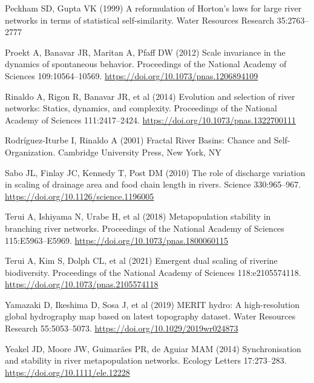 \documentclass[
  12pt,
]{article}
\newlength{\cslhangindent}
\newlength{\cslentryspacingunit} %
\newenvironment{CSLReferences}[2] %
 {%
  \setlength{\parindent}{0pt}
  \ifodd #1
  \let\oldpar\par
  \def\par{\hangindent=\cslhangindent\oldpar}
  \fi
  \setlength{\parskip}{#2\cslentryspacingunit}
 }%
 {}
\begin{document}
\begin{CSLReferences}{1}{0}
\leavevmode{}%
Peckham SD, Gupta VK (1999) A reformulation of {Horton}'s laws for large river networks in terms of statistical self-similarity. Water Resources Research 35:2763--2777

\leavevmode{}%
Proekt A, Banavar JR, Maritan A, Pfaff DW (2012) Scale invariance in the dynamics of spontaneous behavior. Proceedings of the National Academy of Sciences 109:10564--10569. \url{https://doi.org/10.1073/pnas.1206894109}

\leavevmode{}%
Rinaldo A, Rigon R, Banavar JR, et al (2014) Evolution and selection of river networks: {Statics}, dynamics, and complexity. Proceedings of the National Academy of Sciences 111:2417--2424. \url{https://doi.org/10.1073/pnas.1322700111}

\leavevmode{}%
Rodríguez-Iturbe I, Rinaldo A (2001) Fractal {River Basins}: {Chance} and {Self-Organization}. {Cambridge University Press}, {New York, NY}

\leavevmode{}%
Sabo JL, Finlay JC, Kennedy T, Post DM (2010) The role of discharge variation in scaling of drainage area and food chain length in rivers. Science 330:965--967. \url{https://doi.org/10.1126/science.1196005}

\leavevmode{}%
Terui A, Ishiyama N, Urabe H, et al (2018) Metapopulation stability in branching river networks. Proceedings of the National Academy of Sciences 115:E5963--E5969. \url{https://doi.org/10.1073/pnas.1800060115}

\leavevmode{}%
Terui A, Kim S, Dolph CL, et al (2021) Emergent dual scaling of riverine biodiversity. Proceedings of the National Academy of Sciences 118:e2105574118. \url{https://doi.org/10.1073/pnas.2105574118}

\leavevmode{}%
Yamazaki D, Ikeshima D, Sosa J, et al (2019) {MERIT} hydro: A high-resolution global hydrography map based on latest topography dataset. Water Resources Research 55:5053--5073. \url{https://doi.org/10.1029/2019wr024873}

\leavevmode{}%
Yeakel JD, Moore JW, Guimarães PR, de Aguiar MAM (2014) Synchronisation and stability in river metapopulation networks. Ecology Letters 17:273--283. \url{https://doi.org/10.1111/ele.12228}

\end{CSLReferences}
\end{document}
